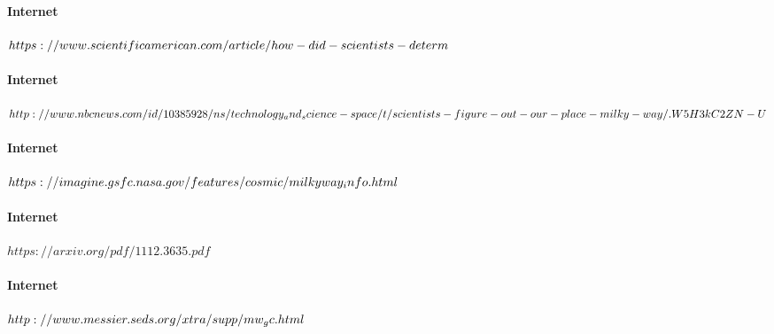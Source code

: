 \documentclass[%
 reprint,
 amsmath,amssymb,
 aps,
]{revtex4-1}
\begin{document}
\paragraph{Internet}
$https://www.scientificamerican.com/article/ \\ how-did-scientists-determ$
\paragraph{Internet}
$http://www.nbcnews.com/id/10385928/ns/ \\
technology_and_science-space/t/scientists-\\
figure-out-our-place-milky-way/.W5H3kC2ZN-U$
\paragraph{Internet}
$https://imagine.gsfc.nasa.gov/features/ \\cosmic/milkyway_info.html $
\paragraph{Internet}
$https://arxiv.org/pdf/1112.3635.pdf$ 
\paragraph{Internet}
$http://www.messier.seds.org/xtra/\\supp/mw_gc.html $
\end{document}
